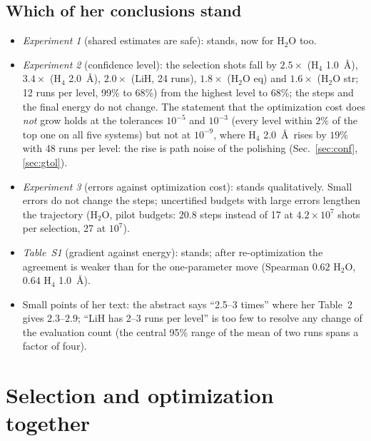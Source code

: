 \documentclass[11pt]{article}
\begin{document}
\subsection{Which of her conclusions stand}
\begin{itemize}
  \item \emph{Experiment 1} (shared estimates are safe): stands, now for H$_2$O too.
  \item \emph{Experiment 2} (confidence level): the selection shots fall by $2.5\times$ (H$_4$ 1.0~\AA), $3.4\times$ (H$_4$ 2.0~\AA), $2.0\times$ (LiH, 24 runs), $1.8\times$ (H$_2$O eq) and $1.6\times$ (H$_2$O str; 12 runs per level, 99\% to 68\%) from the highest level to 68\%; the steps and the final energy do not change.
        The statement that the optimization cost does \emph{not} grow holds at the tolerances $10^{-5}$ and $10^{-3}$ (every level within $2\%$ of the top one on all five systems) but not at $10^{-9}$, where H$_4$ 2.0~\AA\ rises by $19\%$ with 48 runs per level: the rise is path noise of the polishing (Sec.~\ref{sec:conf}, \ref{sec:gtol}).
  \item \emph{Experiment 3} (errors against optimization cost): stands qualitatively. Small errors do not change the steps; uncertified budgets with large errors lengthen the trajectory (H$_2$O, pilot budgets: $20.8$ steps instead of 17 at $4.2\times10^7$ shots per selection, 27 at $10^7$).
  \item \emph{Table~S1} (gradient against energy): stands; after re-optimization the agreement is weaker than for the one-parameter move (Spearman $0.62$ H$_2$O, $0.64$ H$_4$ 1.0~\AA).
  \item Small points of her text: the abstract says ``2.5--3 times'' where her Table~2 gives $2.3$--$2.9$; ``LiH has 2--3 runs per level'' is too few to resolve any change of the evaluation count (the central 95\% range of the mean of two runs spans a factor of four).
\end{itemize}

\section{Selection and optimization together}\label{sec:cost}
\end{document}

